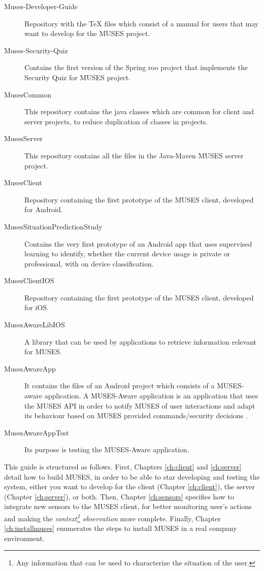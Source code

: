 \begin{description}
  \item[Muses-Developer-Guide] Repository with the TeX files which consist of a manual for users that may want to develop for the MUSES project.
  \item[Muses-Security-Quiz] Contains the first version of the Spring roo project that implements the Security Quiz for MUSES project.
  \item[MusesCommon] This repository contains the java classes which are common for client and server projects, to reduce duplication of classes in projects.
  \item[MusesServer] This repository contains all the files in the Java-Maven MUSES server project.
  \item[MusesClient] Repository containing the first prototype of the MUSES client, developed for Android.
  \item[MusesSituationPredictionStudy] Contains the very first prototype of an Android app that uses supervised learning to identify, whether the current device usage is private or professional, with on device classification.
  \item[MusesClientIOS] Repository containing the first prototype of the MUSES client, developed for iOS.
  \item[MusesAwareLibIOS] A library that can be used by applications to retrieve information relevant for MUSES.
  \item[MusesAwareApp] It contains the files of an Android project which consists of a MUSES-aware application. A MUSES-Aware application is an application that uses the MUSES API in order to notify MUSES of user interactions and adapt its behaviour based on MUSES provided commands/security decisions \cite{deliverable24}.
  \item[MusesAwareAppTest] Its purpose is testing the MUSES-Aware application.
\end{description}

This guide is structured as follows. First, Chapters \ref{ch:client} and \ref{ch:server} detail how to build MUSES, in order to be able to star developing and testing the system, either you want to develop for the client (Chapter \ref{ch:client}), the server (Chapter \ref{ch:server}), or both. Then, Chapter \ref{ch:sensors} specifies how to integrate new sensors to the MUSES client, for better monitoring user's actions and making the \textit{context\footnote{Any information that can be used to characterize the situation of the user.\cite{deliverable61}} observation} more complete. Finally, Chapter \ref{ch:installmuses} enumerates the steps to install MUSES in a real company environment.

